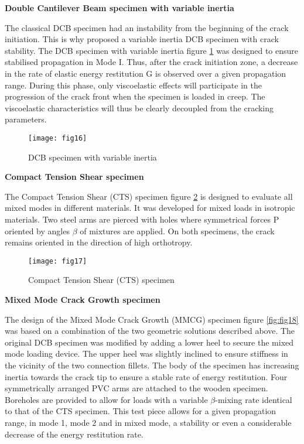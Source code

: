 \newpage
\textbf{Double Cantilever Beam specimen with variable inertia}

The classical DCB specimen had an instability from the beginning of the crack initiation. This is why \cite{Dubois2002} proposed a variable inertia DCB specimen with crack stability. The DCB specimen with variable inertia figure \ref{fig:fig16} was designed to ensure stabilised propagation in Mode I. Thus, after the crack initiation zone, a decrease in the rate of elastic energy restitution G is observed over a given propagation range. During this phase, only viscoelastic effects will participate in the progression of the crack front when the specimen is loaded in creep. The viscoelastic characteristics will thus be clearly decoupled from the cracking parameters. 


\begin{figure}[htp]
	\centering
	\texttt{[image: fig16]}
	\caption{DCB specimen with variable inertia \cite{Dubois2002}}
	\label{fig:fig16}
\end{figure}


\textbf{Compact Tension Shear specimen}

The Compact Tension Shear (CTS) specimen figure \ref{fig:fig17} is designed to evaluate all mixed modes in different materials. It was developed for mixed loads in isotropic materials. Two steel arms are pierced with holes where symmetrical forces P oriented by angles $\beta$ of mixtures are applied. On both specimens, the crack remains oriented in the direction of high orthotropy.

\begin{figure}[tp]
	\centering
	\texttt{[image: fig17]}
	\caption{Compact Tension Shear (CTS) specimen}
	\label{fig:fig17}
\end{figure}

\textbf{Mixed Mode Crack Growth specimen}

The design of the Mixed Mode Crack Growth (MMCG) specimen figure \ref{fig:fig18} was based on a combination of the two geometric solutions described above. The original DCB specimen was modified by adding a lower heel to secure the mixed mode loading device. The upper heel was slightly inclined to ensure stiffness in the vicinity of the two connection fillets. The body of the specimen has increasing inertia towards the crack tip to ensure a stable rate of energy restitution. Four symmetrically arranged PVC arms are attached to the wooden specimen. Boreholes are provided to allow for loads with a variable $\beta$-mixing rate identical to that of the CTS specimen. This test piece allows for a given propagation range, in mode 1, mode 2 and in mixed mode, a stability or even a considerable decrease of the energy restitution rate\cite{MoutouPitti2008}.






